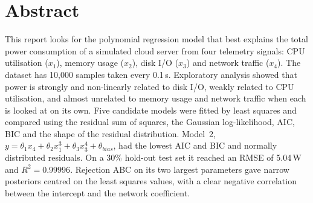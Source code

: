 \section*{Abstract}

This report looks for the polynomial regression model that best explains the total power consumption of a simulated cloud server from four telemetry signals: CPU utilisation ($x_1$), memory usage ($x_2$), disk I/O ($x_3$) and network traffic ($x_4$). The dataset has 10{,}000 samples taken every 0.1\,s. Exploratory analysis showed that power is strongly and non-linearly related to disk I/O, weakly related to CPU utilisation, and almost unrelated to memory usage and network traffic when each is looked at on its own. Five candidate models were fitted by least squares and compared using the residual sum of squares, the Gaussian log-likelihood, AIC, BIC and the shape of the residual distribution. Model~2, $y=\theta_1x_4+\theta_2x_1^3+\theta_3x_3^4+\theta_{bias}$, had the lowest AIC and BIC and normally distributed residuals. On a 30\% hold-out test set it reached an RMSE of 5.04\,W and $R^2=0.99996$. Rejection ABC on its two largest parameters gave narrow posteriors centred on the least squares values, with a clear negative correlation between the intercept and the network coefficient.
